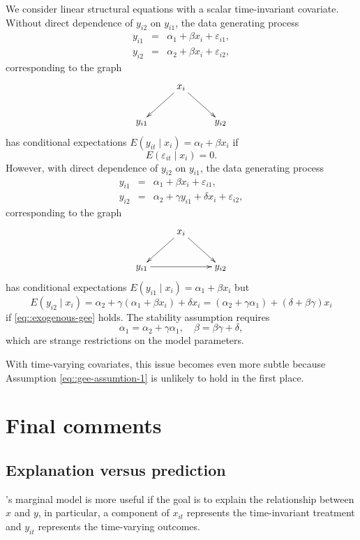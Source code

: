 We consider linear structural equations with a scalar time-invariant covariate. Without direct dependence of $y_{i2}$ on $y_{i1}$, the data generating process
\begin{eqnarray*}
y_{i1} &=& \alpha_1 + \beta  x_i  + \varepsilon_{i1},\\
y_{i2} &=& \alpha_2 + \beta x_i  + \varepsilon_{i2},
\end{eqnarray*}
corresponding to the graph
$$
\xymatrix{
&x_{i} \ar[dl]  \ar[dr] &  \\
y_{i1}   && y_{i2} 
}
$$
has conditional expectations $E(y_{it}\mid x_{i}) =  \alpha_t +  \beta  x_i   $ if 
\begin{equation}
\label{eq::exogenous-gee}
  E(\varepsilon_{it}\mid x_i) = 0.
\end{equation}
However, with direct dependence of $y_{i2}$ on $y_{i1}$, the data generating process
\begin{eqnarray*}
y_{i1} &=& \alpha_1 +  \beta x_i  + \varepsilon_{i1},\\
y_{i2} &=& \alpha_2 +  \gamma  y_{i1}   + \delta x_i   + \varepsilon_{i2},
\end{eqnarray*}
corresponding to the graph
$$
\xymatrix{
&x_{i} \ar[dl]  \ar[dr] &  \\
y_{i1}  \ar[rr] && y_{i2} 
}
$$
has conditional expectations $E(y_{i1}\mid x_{i}) = \alpha_1 +  \beta   x_i $ but 
$$
E(y_{i2}\mid x_{i}) = \alpha_2 +   \gamma  (\alpha_1 +  \beta   x_i)  + \delta x_i  = (\alpha_2 +   \gamma  \alpha_1) +    ( \delta + \beta\gamma )   x_i 
$$ 
if \eqref{eq::exogenous-gee} holds. The stability assumption requires 
$$
 \alpha_1 = \alpha_2 +   \gamma  \alpha_1,\quad  \beta = \beta\gamma + \delta , 
$$ 
which are strange restrictions on the model parameters. 

With time-varying covariates, this issue becomes even more subtle because Assumption \eqref{eq::gee-assumtion-1} is unlikely to hold in the first place. 


\section{Final comments}


\subsection{Explanation versus prediction}


\citet{liang1986longitudinal}'s marginal model is more useful if the goal is to explain the relationship between $x$ and $y$, in particular, a component of $x_{it}$ represents the time-invariant treatment and $y_{it}$ represents the time-varying outcomes. 

